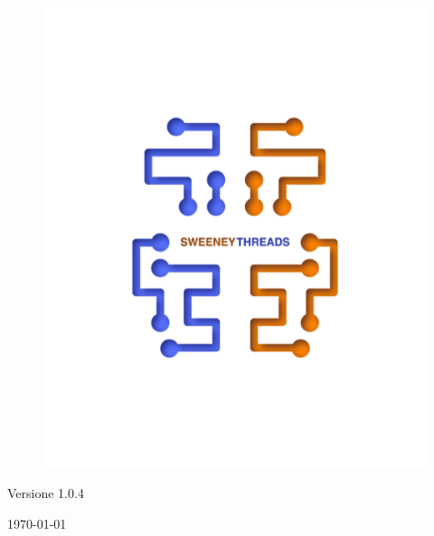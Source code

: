 \documentclass[a4paper]{report}
\begin{document}
\begin{titlepage}
		\begin{figure}[H]
			\centering
			\includegraphics[scale=0.8]{sweeney.png}
		\end{figure}
		\begin{center}
			Versione 1.0.4
		\end{center}
		{\large \today}\\[3cm] 
		\vfill  
	\end{titlepage}
	
	\tableofcontents
	
\end{document}

